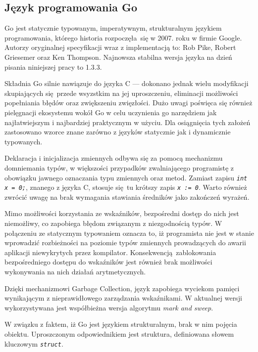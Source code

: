 \subsection{Język programowania Go} %
\label{ss_internals_go}
\par{
Go jest statycznie typowanym, imperatywnym, strukturalnym językiem programowania, którego historia rozpoczęła się w 2007. roku w firmie Google. Autorzy oryginalnej specyfikacji wraz z implementacją to: Rob Pike, Robert Griesemer oraz Ken Thompson.
Najnowsza stabilna wersja języka na dzień pisania niniejszej pracy to 1.3.3.
}
\par{
Składnia Go silnie nawiązuje do języka C --- dokonano jednak wielu modyfikacji skupiających się przede wsyzstkim na jej uproszczeniu, eliminacji możliwości popełniania błędów oraz zwiększeniu zwięzłości.
Dużo uwagi poświęca się również pielęgnacji ekosystemu wokół Go w celu uczynienia go narzędziem jak najłatwiejszym i najbardziej praktycznym w użyciu.
Dla osiągnięcia tych założeń zastosowano wzorce znane zarówno z języków statycznie jak i dynamicznie typowanych.
}
\par{Deklaracja i inicjalizacja zmiennych odbywa się za pomocą mechanizmu domniemania typów, w większości przypadków zwalniającego programistę z obowiązku jawnego oznaczania typu zmiennych oraz metod. Zamiast zapisu \textit{\lstinline{int x = 0;}}, znanego z języka C, stosuje się tu krótszy zapis \textit{\lstinline{x := 0}}. Warto również zwrócić uwagę na brak wymagania stawiania średników jako zakończeń wyrażeń.
}
 \par{Mimo możliwości korzystania ze wskaźników, bezpośredni dostęp do nich jest niemożliwy, co zapobiega błędom związanym z niezgodnością typów. W połączeniu ze statycznym typowaniem oznacza to, iż programista nie jest w stanie wprowadzić rozbieżności na poziomie typów zmiennych prowadzących do awarii aplikacji niewykrytych przez kompilator. Konsekwencją zablokowania bezpośredniego dostępu do wskaźników jest również brak możliwości wykonywania na nich działań arytmetycznych.
 }
 \par{
Dzięki mechanizmowi Garbage Collection, język zapobiega wyciekom pamięci wynikającym z nieprawidłowego zarządzania wskaźnikami. W aktualnej wersji wykorzystywana jest współbieżna wersja algorytmu \textit{mark and sweep}.
}
\par{
 W związku z faktem, iż Go jest językiem strukturalnym, brak w nim pojęcia obiektu. Uproszczonym odpowiednikiem jest struktura, definiowana słowem kluczowym \textit{\lstinline{struct}}.
}
